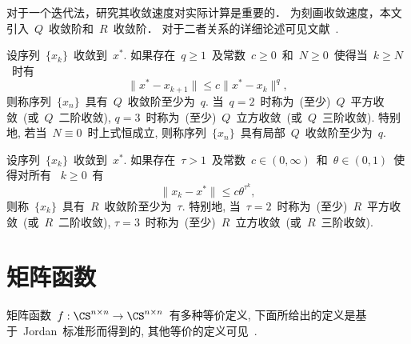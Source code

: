 对于一个迭代法，研究其收敛速度对实际计算是重要的．
为刻画收敛速度，本文引入~$Q$~收敛阶和~$R$~收敛阶．
对于二者关系的详细论述可见文献~\cite{Potra1989,Jay2001,Ortega1970,Rheinboldt1998}.

\begin{definition}[$Q$~阶收敛]
\label{def:Q-orderConv} 设序列~$\{x_k\}$~收敛到~$x^*$. 如果存在~$q
\geqslant 1$~及常数~$c \geqslant 0$~和~$N \geqslant 0$~使得当~$k
\geqslant N$~时有
$$
\|x^* - x_{k+1}\| \leqslant c\|x^* - x_k\|^q,
$$
则称序列~$\{x_n\}$~具有~$Q$~收敛阶至少为~$q$.  当~$q =
2$~时称为~(至少)~$Q$~平方收敛~(或~$Q$~二阶收敛), $q =
3$~时称为~(至少)~$Q$~立方收敛~(或~$Q$~三阶收敛). 特别地,
若当~$N\equiv0$~时上式恒成立,
则称序列~$\{x_n\}$~具有局部~$Q$~收敛阶至少为~$q$.
\end{definition}

\begin{definition}[$R$~阶收敛]
\label{def:R-orderConv} 设序列~$\{x_k\}$~收敛到~$x^*$.
如果存在~$\tau > 1$~及常数~$c \in (0,\infty)$~和~$\theta \in
(0,1)$~使得对所有 ~$k \geq 0$~有
$$
\|x_k - x^*\| \leqslant c \theta^{\tau^k},
$$
则称~$\{x_k\}$~具有~$R$~收敛阶至少为~$\tau$. 特别地, 当~$\tau =
2$~时称为~(至少)~$R$~平方收敛~(或~$R$~二阶收敛), $\tau =
3$~时称为~(至少)~$R$~立方收敛~(或~$R$~三阶收敛).
\end{definition}







\section{矩阵函数}

矩阵函数~$f:\CS^{n\times n} \to \CS^{n\times n}$~有多种等价定义,
下面所给出的定义是基于~Jordan~标准形而得到的,
其他等价的定义可见~\cite[1.2~节]{Higham2008}.

